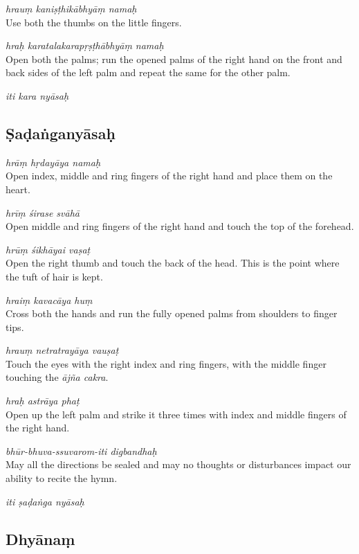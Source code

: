 \documentclass[11pt,oneside,a4paper]{article}
\newenvironment{shloka}[1]
  {\bigskip\center#1\varwidth{\linewidth}}
  {\endvarwidth\endcenter\bigskip}
\newcommand{\tl}[1]{\emph{#1}}
\begin{document}
\tl{hrauṃ kaniṣṭhikābhyāṃ namaḥ}\\
Use both the thumbs on the little fingers.

\tl{hraḥ karatalakarapṛṣṭhābhyāṃ namaḥ}\\
Open both the palms; run the opened palms of the right hand on the front and
back sides of the left palm and repeat the same for the other palm.

\begin{shloka}\itshape
  iti kara nyāsaḥ
\end{shloka}

\subsection{Ṣaḍaṅganyāsaḥ}

\tl{hrāṃ hṛdayāya namaḥ}\\
Open index, middle and ring fingers of the right hand and place them on
the heart.

\tl{hrīṃ śirase svāhā}\\
Open middle and ring fingers of the right hand and touch the top of the forehead.

\tl{hrūṃ śikhāyai vaṣaṭ}\\
Open the right thumb and touch the back of the head. This is the point where
the tuft of hair is kept.

\tl{hraiṃ kavacāya huṃ}\\
Cross both the hands and run the fully opened palms from shoulders to
finger tips.

\tl{hrauṃ netratrayāya vauṣaṭ}\\
Touch the eyes with the right index and ring fingers, with the middle finger
touching the \tl{ājña cakra}.

\tl{hraḥ astrāya phaṭ}\\
Open up the left palm and strike it three times with index and middle fingers
of the right hand.

\tl{bhūr-bhuva-ssuvarom-iti digbandhaḥ}\\
May all the directions be sealed and may no thoughts or disturbances impact our
ability to recite the hymn.

\begin{shloka}\itshape
  iti ṣaḍaṅga nyāsaḥ
\end{shloka}

\subsection{Dhyānaṃ}
\end{document}
